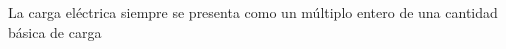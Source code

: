 \documentclass[preview]{standalone}
\begin{document}
La carga eléctrica siempre se presenta como un múltiplo
entero de una cantidad básica de carga\\
\end{document}
